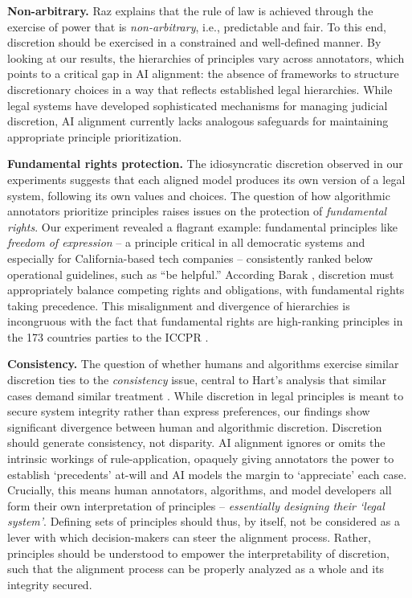 \documentclass{article}
\begin{document}
\noindent\textbf{Non-arbitrary.}
Raz \cite{raz2009authority} explains that the rule of law is achieved through the exercise of power that is \textit{non-arbitrary}, i.e., predictable and fair. To this end, discretion should be exercised in a constrained and well-defined manner.
By looking at our results, the hierarchies of principles vary across annotators, which points to a critical gap in AI alignment: the absence of frameworks to structure discretionary choices in a way that reflects established legal hierarchies. 
While legal systems have developed sophisticated mechanisms for managing judicial discretion, AI alignment currently lacks analogous safeguards for maintaining appropriate principle prioritization.



\noindent\textbf{Fundamental rights protection.} The idiosyncratic discretion observed in our experiments suggests that each aligned model produces its own version of a legal system, following its own values and choices. The question of how algorithmic annotators prioritize principles raises issues on 
the protection of \textit{fundamental rights}. Our experiment revealed a flagrant example: fundamental principles like \textit{freedom of expression} – a principle critical in all democratic systems and especially for California-based tech companies – 
consistently ranked below operational guidelines, such as ``be helpful.'' According Barak \cite{barak2009judge}, discretion must appropriately balance competing rights and obligations, with fundamental rights taking precedence. This misalignment and divergence of hierarchies is incongruous with the fact that fundamental rights are high-ranking principles in the 173 countries parties to the ICCPR \cite{iccpr_ohchr}. 


\noindent\textbf{Consistency.} 
The question of whether humans and algorithms exercise similar discretion ties to the \textit{consistency} issue, central to Hart's analysis that similar cases demand similar treatment \cite{hart2012concept}. While discretion in legal principles is meant to secure system integrity rather than express preferences, our findings show significant divergence between human and algorithmic discretion. Discretion should generate consistency, not disparity. 
AI alignment ignores or omits the intrinsic workings of rule-application, opaquely giving annotators the power to establish `precedents' at-will and AI models the margin to `appreciate' each case. Crucially, this means human annotators, algorithms, and model developers all form their own interpretation of principles -- \textit{essentially designing their `legal system'}. 
Defining sets of principles should thus, by itself, not be considered as a lever with which decision-makers can steer the alignment process. Rather, principles should be understood to empower the interpretability of discretion, such that the alignment process can be properly analyzed as a whole and its integrity secured. 
\end{document}
